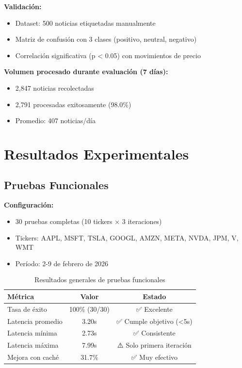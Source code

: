 \documentclass[12pt,a4paper]{article}
\begin{document}
\textbf{Validación:}
\begin{itemize}
    \item Dataset: 500 noticias etiquetadas manualmente
    \item Matriz de confusión con 3 clases (positivo, neutral, negativo)
    \item Correlación significativa (p < 0.05) con movimientos de precio
\end{itemize}

\textbf{Volumen procesado durante evaluación (7 días):}
\begin{itemize}
    \item 2,847 noticias recolectadas
    \item 2,791 procesadas exitosamente (98.0\%)
    \item Promedio: 407 noticias/día
\end{itemize}

\section{Resultados Experimentales}

\subsection{Pruebas Funcionales}

\textbf{Configuración:}
\begin{itemize}
    \item 30 pruebas completas (10 tickers × 3 iteraciones)
    \item Tickers: AAPL, MSFT, TSLA, GOOGL, AMZN, META, NVDA, JPM, V, WMT
    \item Período: 2-9 de febrero de 2026
\end{itemize}

\begin{table}[H]
\centering
\begin{tabular}{lcc}
\toprule
\textbf{Métrica} & \textbf{Valor} & \textbf{Estado} \\
\midrule
Tasa de éxito & 100\% (30/30) & ✅ Excelente \\
Latencia promedio & 3.20s & ✅ Cumple objetivo (<5s) \\
Latencia mínima & 2.73s & ✅ Consistente \\
Latencia máxima & 7.99s & ⚠️ Solo primera iteración \\
Mejora con caché & 31.7\% & ✅ Muy efectivo \\
\bottomrule
\end{tabular}
\caption{Resultados generales de pruebas funcionales}
\end{table}
\end{document}
